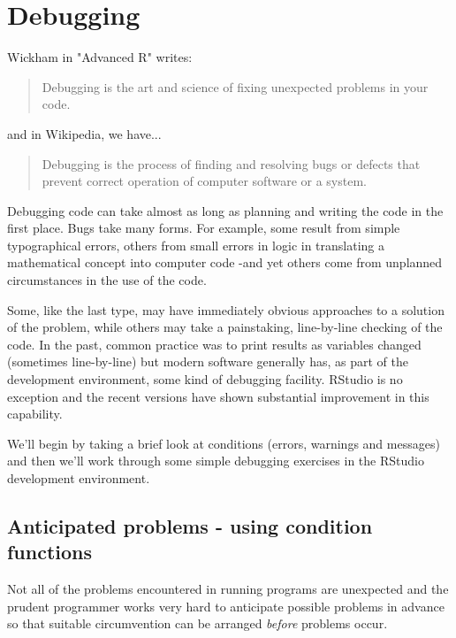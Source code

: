 \documentclass[titlepage]{book}\usepackage{knitr}
\begin{document}
\section{Debugging}

Wickham in "Advanced R" \cite{Wickham2015a} writes: 

\begin{quote}
Debugging is the art and science of fixing unexpected problems in your code. 
\end{quote}

and in Wikipedia, we have...

\begin{quote}
Debugging is the process of finding and resolving bugs or defects that prevent correct operation of computer software or a system.
\end{quote}

Debugging code can take almost as long as planning and writing the code in the first place.  Bugs take many forms. For example, some result from simple typographical errors, others from small errors in logic in translating a mathematical concept into computer code -and yet others come from unplanned circumstances in the use of the code. 

Some, like the last type, may have immediately obvious approaches to a solution of the problem, while others may take a painstaking, line-by-line checking of the code. In the past, common practice was to print results as variables changed (sometimes line-by-line) but modern software generally has, as part of the development environment, some kind of debugging facility. RStudio is no exception and the recent versions have shown substantial improvement in this capability.

We'll begin by taking a brief look at conditions (errors, warnings and messages) and then we'll work through some simple debugging exercises in the RStudio development environment.

\subsection{Anticipated problems - using condition functions}

Not all of the problems encountered in running programs are unexpected and the prudent programmer works very hard to anticipate possible problems in advance so that suitable circumvention can be arranged \emph{before} problems occur.
\end{document}
